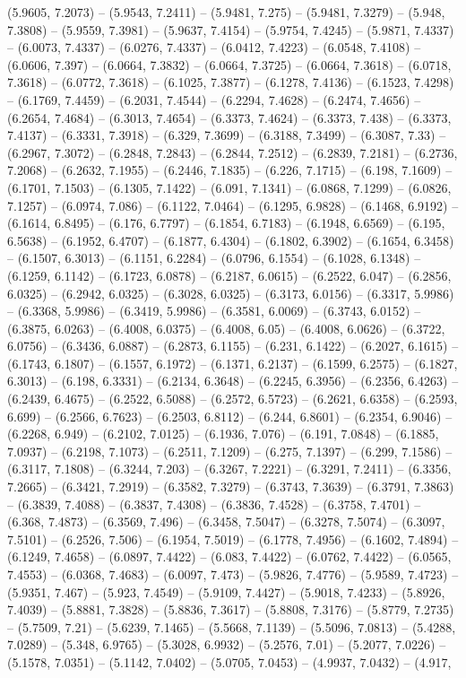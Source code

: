 (5.9605, 7.2073) -- (5.9543, 7.2411) -- (5.9481, 7.275) -- (5.9481, 7.3279) -- (5.948, 7.3808) -- (5.9559, 7.3981) -- (5.9637, 7.4154) -- (5.9754, 7.4245) -- (5.9871, 7.4337) -- (6.0073, 7.4337) -- (6.0276, 7.4337) -- (6.0412, 7.4223) -- (6.0548, 7.4108) -- (6.0606, 7.397) -- (6.0664, 7.3832) -- (6.0664, 7.3725) -- (6.0664, 7.3618) -- (6.0718, 7.3618) -- (6.0772, 7.3618) -- (6.1025, 7.3877) -- (6.1278, 7.4136) -- (6.1523, 7.4298) -- (6.1769, 7.4459) -- (6.2031, 7.4544) -- (6.2294, 7.4628) -- (6.2474, 7.4656) -- (6.2654, 7.4684) -- (6.3013, 7.4654) -- (6.3373, 7.4624) -- (6.3373, 7.438) -- (6.3373, 7.4137) -- (6.3331, 7.3918) -- (6.329, 7.3699) -- (6.3188, 7.3499) -- (6.3087, 7.33) -- (6.2967, 7.3072) -- (6.2848, 7.2843) -- (6.2844, 7.2512) -- (6.2839, 7.2181) -- (6.2736, 7.2068) -- (6.2632, 7.1955) -- (6.2446, 7.1835) -- (6.226, 7.1715) -- (6.198, 7.1609) -- (6.1701, 7.1503) -- (6.1305, 7.1422) -- (6.091, 7.1341) -- (6.0868, 7.1299) -- (6.0826, 7.1257) -- (6.0974, 7.086) -- (6.1122, 7.0464) -- (6.1295, 6.9828) -- (6.1468, 6.9192) -- (6.1614, 6.8495) -- (6.176, 6.7797) -- (6.1854, 6.7183) -- (6.1948, 6.6569) -- (6.195, 6.5638) -- (6.1952, 6.4707) -- (6.1877, 6.4304) -- (6.1802, 6.3902) -- (6.1654, 6.3458) -- (6.1507, 6.3013) -- (6.1151, 6.2284) -- (6.0796, 6.1554) -- (6.1028, 6.1348) -- (6.1259, 6.1142) -- (6.1723, 6.0878) -- (6.2187, 6.0615) -- (6.2522, 6.047) -- (6.2856, 6.0325) -- (6.2942, 6.0325) -- (6.3028, 6.0325) -- (6.3173, 6.0156) -- (6.3317, 5.9986) -- (6.3368, 5.9986) -- (6.3419, 5.9986) -- (6.3581, 6.0069) -- (6.3743, 6.0152) -- (6.3875, 6.0263) -- (6.4008, 6.0375) -- (6.4008, 6.05) -- (6.4008, 6.0626) -- (6.3722, 6.0756) -- (6.3436, 6.0887) -- (6.2873, 6.1155) -- (6.231, 6.1422) -- (6.2027, 6.1615) -- (6.1743, 6.1807) -- (6.1557, 6.1972) -- (6.1371, 6.2137) -- (6.1599, 6.2575) -- (6.1827, 6.3013) -- (6.198, 6.3331) -- (6.2134, 6.3648) -- (6.2245, 6.3956) -- (6.2356, 6.4263) -- (6.2439, 6.4675) -- (6.2522, 6.5088) -- (6.2572, 6.5723) -- (6.2621, 6.6358) -- (6.2593, 6.699) -- (6.2566, 6.7623) -- (6.2503, 6.8112) -- (6.244, 6.8601) -- (6.2354, 6.9046) -- (6.2268, 6.949) -- (6.2102, 7.0125) -- (6.1936, 7.076) -- (6.191, 7.0848) -- (6.1885, 7.0937) -- (6.2198, 7.1073) -- (6.2511, 7.1209) -- (6.275, 7.1397) -- (6.299, 7.1586) -- (6.3117, 7.1808) -- (6.3244, 7.203) -- (6.3267, 7.2221) -- (6.3291, 7.2411) -- (6.3356, 7.2665) -- (6.3421, 7.2919) -- (6.3582, 7.3279) -- (6.3743, 7.3639) -- (6.3791, 7.3863) -- (6.3839, 7.4088) -- (6.3837, 7.4308) -- (6.3836, 7.4528) -- (6.3758, 7.4701) -- (6.368, 7.4873) -- (6.3569, 7.496) -- (6.3458, 7.5047) -- (6.3278, 7.5074) -- (6.3097, 7.5101) -- (6.2526, 7.506) -- (6.1954, 7.5019) -- (6.1778, 7.4956) -- (6.1602, 7.4894) -- (6.1249, 7.4658) -- (6.0897, 7.4422) -- (6.083, 7.4422) -- (6.0762, 7.4422) -- (6.0565, 7.4553) -- (6.0368, 7.4683) -- (6.0097, 7.473) -- (5.9826, 7.4776) -- (5.9589, 7.4723) -- (5.9351, 7.467) -- (5.923, 7.4549) -- (5.9109, 7.4427) -- (5.9018, 7.4233) -- (5.8926, 7.4039) -- (5.8881, 7.3828) -- (5.8836, 7.3617) -- (5.8808, 7.3176) -- (5.8779, 7.2735) -- (5.7509, 7.21) -- (5.6239, 7.1465) -- (5.5668, 7.1139) -- (5.5096, 7.0813) -- (5.4288, 7.0289) -- (5.348, 6.9765) -- (5.3028, 6.9932) -- (5.2576, 7.01) -- (5.2077, 7.0226) -- (5.1578, 7.0351) -- (5.1142, 7.0402) -- (5.0705, 7.0453) -- (4.9937, 7.0432) -- (4.917, 